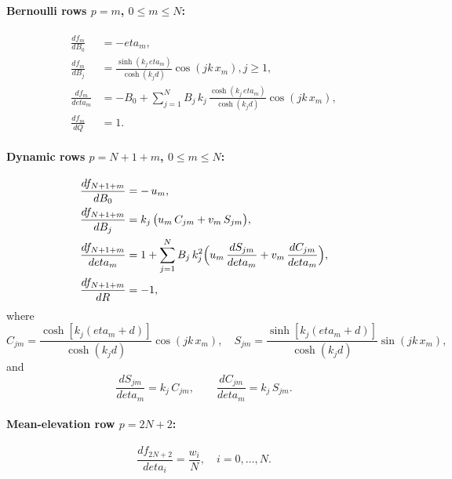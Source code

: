 \documentclass[journal,10pt,twocolumn]{IEEEtran}
\def\eta{eta}%
\def\partial{d}%
\def\;{ }%
\begin{document}
    \paragraph{Bernoulli rows $p=m$, $0\le m\le N$:}
    \begin{align}
        \frac{\partial f_{m}}{\partial B_{0}}
        &= -\eta_{m},
        \\
        \frac{\partial f_{m}}{\partial B_{j}}
        &= \frac{\sinh(k_{j}\,\eta_{m})}{\cosh(k_{j}d)}\cos(jk\,x_{m}),\; j\ge1,
        \\
        \frac{\partial f_{m}}{\partial \eta_{m}}
        &= -B_{0}
        + \sum_{j=1}^{N}B_{j}\,k_{j}\,\frac{\cosh(k_{j}\,\eta_{m})}{\cosh(k_{j}d)}\cos(jk\,x_{m}),
        \\
        \frac{\partial f_{m}}{\partial Q}
        &= 1.
    \end{align}

    \paragraph{Dynamic rows $p=N+1+m$, $0\le m\le N$:}
    \begin{align}
        \frac{\partial f_{N+1+m}}{\partial B_{0}}
        &= -\,u_{m},
        \\
        \frac{\partial f_{N+1+m}}{\partial B_{j}}
        &= k_{j}\,\bigl(u_{m}\,C_{jm} + v_{m}\,S_{jm}\bigr),
        \\
        \frac{\partial f_{N+1+m}}{\partial \eta_{m}}
        &= 1
        + \sum_{j=1}^{N}
        B_{j}\,k_{j}^{2}
        \Bigl(u_{m}\,\frac{\partial S_{jm}}{\partial \eta_{m}}
        + v_{m}\,\frac{\partial C_{jm}}{\partial \eta_{m}}\Bigr),
        \\
        \frac{\partial f_{N+1+m}}{\partial R}
        &= -1,
    \end{align}
    where
    \[
        C_{jm} = \frac{\cosh[k_{j}(\eta_{m}+d)]}{\cosh(k_{j}d)}\cos(jk\,x_{m}),
        \quad
        S_{jm} = \frac{\sinh[k_{j}(\eta_{m}+d)]}{\cosh(k_{j}d)}\sin(jk\,x_{m}),
    \]
    and
    \[
        \frac{\partial S_{jm}}{\partial \eta_{m}} = k_{j} \,C_{jm},
        \qquad
        \frac{\partial C_{jm}}{\partial \eta_{m}} = k_{j} \,S_{jm}.
    \]

    \paragraph{Mean-elevation row $p=2N+2$:}
    \[
        \frac{\partial f_{2N+2}}{\partial \eta_{i}}
        = \frac{w_i}{N},\quad i=0,\dots,N.
    \]
\end{document}
